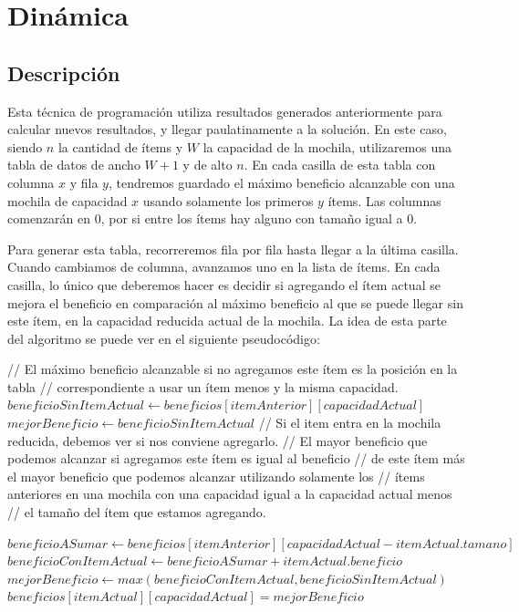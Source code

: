 \documentclass[10pt, a4paper]{article}
\begin{document}
\section{Dinámica}
\subsection{Descripción}
Esta técnica de programación utiliza resultados generados anteriormente para calcular nuevos resultados, y llegar paulatinamente a la solución. En este caso, siendo $n$ la cantidad de ítems y $W$ la capacidad de la mochila, utilizaremos una tabla de datos de ancho $W + 1$ y de alto $n$. En cada casilla de esta tabla con columna $x$ y fila $y$, tendremos guardado el máximo beneficio alcanzable con una mochila de capacidad $x$ usando solamente los primeros $y$ ítems. Las columnas comenzarán en 0, por si entre los ítems hay alguno con tamaño igual a 0.\par
Para generar esta tabla, recorreremos fila por fila hasta llegar a la última casilla. Cuando cambiamos de columna, avanzamos uno en la lista de ítems. En cada casilla, lo único que deberemos hacer es decidir si agregando el ítem actual se mejora el beneficio en comparación al máximo beneficio al que se puede llegar sin este ítem, en la capacidad reducida actual de la mochila. La idea de esta parte del algoritmo se puede ver en el siguiente pseudocódigo:\par

\begin{algorithm}
\begin{algorithmic}[1]
\State // El máximo beneficio alcanzable si no agregamos este ítem es la posición en la tabla
\State // correspondiente a usar un ítem menos y la misma capacidad.
\State $beneficioSinItemActual \gets beneficios[itemAnterior][capacidadActual]$
\State $mejorBeneficio \gets beneficioSinItemActual$
	\State // Si el item entra en la mochila reducida, debemos ver si nos conviene agregarlo.
	\State // El mayor beneficio que podemos alcanzar si agregamos este ítem es igual al beneficio
	\State // de este ítem más el mayor beneficio que podemos alcanzar utilizando solamente los
	\State // ítems anteriores en una mochila con una capacidad igual a la capacidad actual menos
	\State // el tamaño del ítem que estamos agregando.

	\State $beneficioASumar \gets beneficios[itemAnterior][capacidadActual - itemActual.tamano]$
	\State $beneficioConItemActual \gets beneficioASumar + itemActual.beneficio$
	\State $mejorBeneficio \gets max(beneficioConItemActual, beneficioSinItemActual)$
\EndIf
\State $beneficios[itemActual][capacidadActual] = mejorBeneficio$
\end{algorithmic}
\end{algorithm}
\end{document}
